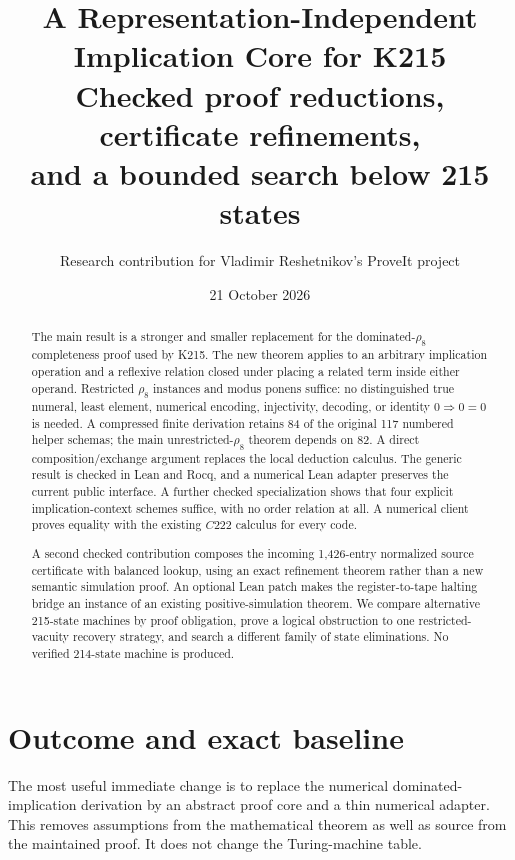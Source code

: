 \documentclass[11pt]{article}
\title{A Representation-Independent Implication Core for K215\\\large Checked proof reductions, certificate refinements,\\and a bounded search below 215 states}
\author{Research contribution for Vladimir Reshetnikov's ProveIt project}
\date{21 October 2026}
\theoremstyle{definition}\newtheorem{definition}[theorem]{Definition}
\newcommand{\impop}{\mathbin{\Rightarrow}}
\begin{document}
\maketitle
\begin{abstract}
The main result is a stronger and smaller replacement for the dominated-$\rho_8$ completeness proof used by K215. The new theorem applies to an arbitrary implication operation and a reflexive relation closed under placing a related term inside either operand. Restricted $\rho_8$ instances and modus ponens suffice: no distinguished true numeral, least element, numerical encoding, injectivity, decoding, or identity $0\impop0=0$ is needed. A compressed finite derivation retains 84 of the original 117 numbered helper schemas; the main unrestricted-$\rho_8$ theorem depends on 82. A direct composition/exchange argument replaces the local deduction calculus. The generic result is checked in Lean and Rocq, and a numerical Lean adapter preserves the current public interface. A further checked specialization shows that four explicit implication-context schemes suffice, with no order relation at all. A numerical client proves equality with the existing $C222$ calculus for every code.

A second checked contribution composes the incoming 1,426-entry normalized source certificate with balanced lookup, using an exact refinement theorem rather than a new semantic simulation proof. An optional Lean patch makes the register-to-tape halting bridge an instance of an existing positive-simulation theorem. We compare alternative 215-state machines by proof obligation, prove a logical obstruction to one restricted-vacuity recovery strategy, and search a different family of state eliminations. No verified 214-state machine is produced.
\end{abstract}
\newpage
\tableofcontents
\newpage

\section{Outcome and exact baseline}
The most useful immediate change is to replace the numerical dominated-implication derivation by an abstract proof core and a thin numerical adapter. This removes assumptions from the mathematical theorem as well as source from the maintained proof. It does not change the Turing-machine table.
\end{document}
